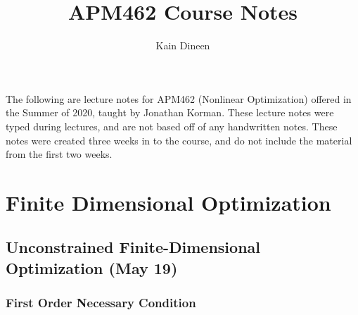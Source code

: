 \documentclass[11pt]{book}
\title{APM462 Course Notes}
\author{Kain Dineen}
\begin{document}
\maketitle

The following are lecture notes for APM462 (Nonlinear Optimization) offered in the Summer of 2020, taught by Jonathan Korman. These lecture notes were typed during lectures, and are not based off of any handwritten notes. These notes were created three weeks in to the course, and do not include the material from the first two weeks.

\tableofcontents

\newpage
\chapter{Finite Dimensional Optimization}

\section{Unconstrained Finite-Dimensional Optimization (May 19)}

\subsection{First Order Necessary Condition}
\end{document}
